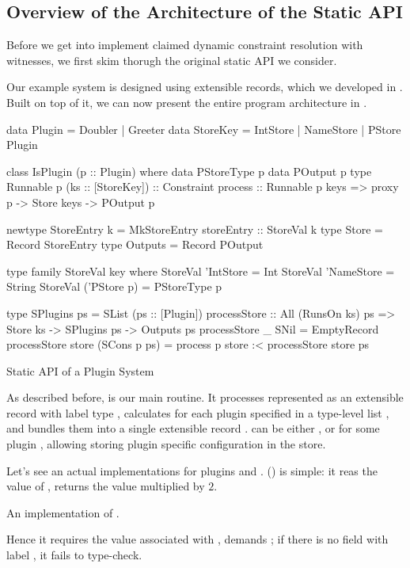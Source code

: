 \documentclass[demotion-paper.tex]{subfiles}
\begin{document}
\subsection{Overview of the Architecture of the Static API}\label{sec:static-api}
Before we get into implement claimed dynamic constraint resolution with witnesses, we first skim thorugh the original static API we consider.

Our example system is designed using extensible records, which we developed in .
Built on top of it, we can now present the entire program architecture in .
\begin{listing}[htpb]
\begin{code}
data Plugin = Doubler | Greeter
data StoreKey = IntStore | NameStore
              | PStore Plugin

class IsPlugin (p :: Plugin) where
  data PStoreType p
  data POutput p
  type Runnable p (ks :: [StoreKey]) :: Constraint
  process :: Runnable p keys
    => proxy p -> Store keys -> POutput p

newtype StoreEntry k =
  MkStoreEntry {storeEntry :: StoreVal k}
type Store = Record StoreEntry
type Outputs = Record POutput

type family StoreVal key where
  StoreVal 'IntStore = Int
  StoreVal 'NameStore = String
  StoreVal ('PStore p) = PStoreType p

type SPlugins ps = SList (ps :: [Plugin])
processStore :: All (RunsOn ks) ps
  => Store ks -> SPlugins ps -> Outputs ps
processStore _ SNil = EmptyRecord
processStore store (SCons p ps) = 
  process p store :< processStore store ps
\end{code}
\caption{Static API of a Plugin System}
\label{lst:plugin-arch}
\end{listing}
As described before,  is our main routine.
It processes  represented as an extensible record with label type , calculates  for each plugin specified in a type-level list , and bundles them into a single extensible record .
 can be either ,  or  for some plugin , allowing storing plugin specific configuration in the store.

Let's see an actual implementations for plugins  and .
 () is simple: it reas the value of , returns the value multiplied by $2$.
\begin{listing}[htbp]
\caption{An implementation of .}
\label{lst:plugin-double}
\end{listing}
Hence it requires the value associated with ,  demands ; if there is no field with label , it fails to type-check.
\end{document}
